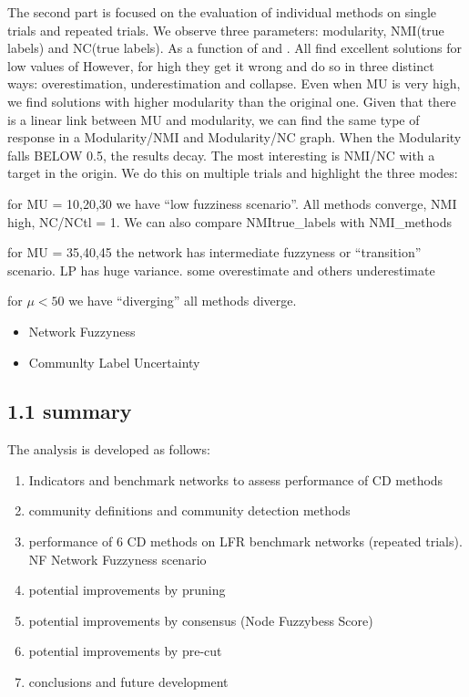 \documentclass[
]{article}
\providecommand{\tightlist}{%
  \setlength{\itemsep}{0pt}\setlength{\parskip}{0pt}}
\begin{document}
The second part is focused on the evaluation of individual methods on
single trials and repeated trials. We observe three parameters:
modularity, NMI(true labels) and NC(true labels). As a function of
\mu and \Q . All find excellent solutions for low values of \mu However,
for high \mu they get it wrong and do so in three distinct ways:
overestimation, underestimation and collapse. Even when MU is very high,
we find solutions with higher modularity than the original one. Given
that there is a linear link between MU and modularity, we can find the
same type of response in a Modularity/NMI and Modularity/NC graph. When
the Modularity falls BELOW 0.5, the results decay. The most interesting
is NMI/NC with a target in the origin. We do this on multiple trials and
highlight the three modes:

for MU = 10,20,30 we have ``low fuzziness scenario''. All methods
converge, NMI high, NC/NCtl = 1. We can also compare NMItrue\_labels
with NMI\_methods

for MU = 35,40,45 the network has intermediate fuzzyness or
``transition'' scenario. LP has huge variance. some overestimate and
others underestimate

for \(\mu<50\) we have ``diverging'' all methods diverge.

\begin{itemize}
\tightlist
\item
  Network Fuzzyness
\item
  Communlty Label Uncertainty
\end{itemize}

\hypertarget{summary}{%
\subsection{1.1 summary}\label{summary}}

The analysis is developed as follows:

\begin{enumerate}
\def\labelenumi{\arabic{enumi}.}
\item
  Indicators and benchmark networks to assess performance of CD methods
\item
  community definitions and community detection methods
\item
  performance of 6 CD methods on LFR benchmark networks (repeated
  trials). NF Network Fuzzyness scenario
\item
  potential improvements by pruning
\item
  potential improvements by consensus (Node Fuzzybess Score)
\item
  potential improvements by pre-cut
\item
  conclusions and future development
\end{enumerate}
\end{document}
